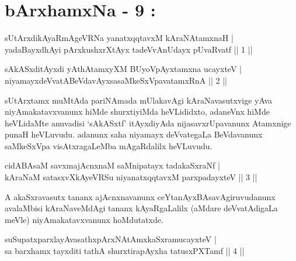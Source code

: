 \chapter{bArxhamxNa - 9 :}


\begin{shl}
sUtArxdikAyaRmAgeVRNa yanatxqqtavxM kAraNAtamxnaH |\\
yadaBayxdhAyi pArxkushxrXtAyx tadeVvAnUdayx pUvaRvatf \hfill || 1 ||
\end{shl}

\begin{shl}
sAkASxditAyxdi yAthAtamxyXM BUyoV\s pAyxtamxna ucayxteV |\\
niyamayxdeVvatABeVdavAyxsasaMkeSxVpavatamxRnA \hfill || 2 ||
\end{shl}

\begin{artha}
sUtArxtamx muMtAda pariNAmada mUlakavAgi kAraNavasutxvige yAva niyAmakatavxvanunx hiMde shurxtiyiMda heVLididxto, adaneVnx hiMde heVLidaMte anuvadisi `sAkASxtf' itAyxdiyAda nijasavxrUpavanunx Atamxnige punaH heVLuvudu. adanunx saha niyamayx deVvategaLa BeVdavanunx saMkeSxVpa visAtxragaLeMba mAgaRdalilx heVLuvudu.
\end{artha}


\begin{shl}
cidABAsaM savxmajAcnxnaM saMnipatayx tadakaSxraNf |\\
kAraNaM satasxvXkAyeVRSu niyanatxqqtavxM parxpadayxteV \hfill || 3 ||
\end{shl}

\begin{artha}
A akaSxravasutx tananx ajAcnxnavanunx ceYtanAyxBAsavAgiruvudanunx avalaMbisi kAraNaveMdAgi tananx kAyaRgaLalilx (aMdare deVvatAdigaLa meVle) niyAmakatavxvanunx hoMdutatxde.
\end{artha}

\begin{shl}
suSupatxparxlayAvasathxpArxNAtAmx\s kaSxramucayxteV |\\
sa barxhamx tayxditi tathA shurxtirapAyxha tatusxPXTamf \hfill || 4 ||
\end{shl}

